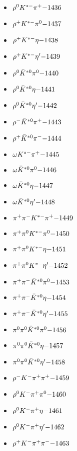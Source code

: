 \begin{multicols}{3}
\begin{itemize}
 \item $ \rho^{0} K^{*-} \pi^{+} \hfill{-1436}$
 \item $ \rho^{+} K^{*-} \pi^{0} \hfill{-1437}$
 \item $ \rho^{+} K^{*-} \eta \hfill{-1438}$
 \item $ \rho^{+} K^{*-} {\eta^{\prime}} \hfill{-1439}$
 \item $ \rho^{0} \bar{K}^{*0} \pi^{0} \hfill{-1440}$
 \item $ \rho^{0} \bar{K}^{*0} \eta \hfill{-1441}$
 \item $ \rho^{0} \bar{K}^{*0} {\eta^{\prime}} \hfill{-1442}$
 \item $ \rho^{-} \bar{K}^{*0} \pi^{+} \hfill{-1443}$
 \item $ \rho^{+} \bar{K}^{*0} \pi^{-} \hfill{-1444}$
 \item $ \omega K^{*-} \pi^{+} \hfill{-1445}$
 \item $ \omega \bar{K}^{*0} \pi^{0} \hfill{-1446}$
 \item $ \omega \bar{K}^{*0} \eta \hfill{-1447}$
 \item $ \omega \bar{K}^{*0} {\eta^{\prime}} \hfill{-1448}$
 \item $ \pi^{+} \pi^{-} K^{*-} \pi^{+} \hfill{-1449}$
 \item $ \pi^{+} \pi^{0} K^{*-} \pi^{0} \hfill{-1450}$
 \item $ \pi^{+} \pi^{0} K^{*-} \eta \hfill{-1451}$
 \item $ \pi^{+} \pi^{0} K^{*-} {\eta^{\prime}} \hfill{-1452}$
 \item $ \pi^{+} \pi^{-} \bar{K}^{*0} \pi^{0} \hfill{-1453}$
 \item $ \pi^{+} \pi^{-} \bar{K}^{*0} \eta \hfill{-1454}$
 \item $ \pi^{+} \pi^{-} \bar{K}^{*0} {\eta^{\prime}} \hfill{-1455}$
 \item $ \pi^{0} \pi^{0} \bar{K}^{*0} \pi^{0} \hfill{-1456}$
 \item $ \pi^{0} \pi^{0} \bar{K}^{*0} \eta \hfill{-1457}$
 \item $ \pi^{0} \pi^{0} \bar{K}^{*0} {\eta^{\prime}} \hfill{-1458}$
 \item $ \rho^{-} K^{-} \pi^{+} \pi^{+} \hfill{-1459}$
 \item $ \rho^{0} K^{-} \pi^{+} \pi^{0} \hfill{-1460}$
 \item $ \rho^{0} K^{-} \pi^{+} \eta \hfill{-1461}$
 \item $ \rho^{0} K^{-} \pi^{+} {\eta^{\prime}} \hfill{-1462}$
 \item $ \rho^{+} K^{-} \pi^{+} \pi^{-} \hfill{-1463}$

\end{itemize}
\end{multicols}
